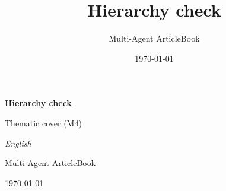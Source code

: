 \documentclass[12pt,a4paper,twoside,openany]{book}
\title{Hierarchy check}
\author{Multi-Agent ArticleBook}
\date{\today}
\begin{document}
\frontmatter
\begin{titlepage}
\centering
\vspace*{2cm}
{\Huge\bfseries Hierarchy check\par}
\vspace{1.2cm}
{\LARGE Thematic cover (M4)\par}
\vspace{0.6cm}
{\large\itshape English\par}
\vfill
{\Large Multi-Agent ArticleBook\par}
\vspace{0.5cm}
{\large \today\par}
\end{titlepage}
\setcounter{tocdepth}{0}
\tableofcontents
\listoffigures
\listoftables
\mainmatter








\backmatter
\printbibliography[title={References}]
\end{document}
